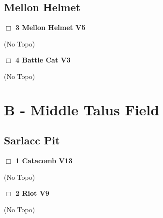 \begin{multicols}{2}
\needspace{10em}
\subsection*{Mellon Helmet}\label{bf:Mellon Helmet}




\needspace{2em}
\label{rt:Mellon Helmet}
\colorbox{RoyalBlue!20}{
\parbox{0.95\linewidth}{
\hspace{-1ex}\textbf{$\Box$
3 Mellon Helmet V5  
}}}
\begin{adjustwidth}{1.3em}{}			


  (No Topo)
\end{adjustwidth}




\needspace{2em}
\label{rt:Battle Cat}
\colorbox{green!20}{
\parbox{0.95\linewidth}{
\hspace{-1ex}\textbf{$\Box$
4 Battle Cat V3  
}}}
\begin{adjustwidth}{1.3em}{}			


  (No Topo)
\end{adjustwidth}





\newpage

\section{B - Middle Talus Field}\label{sa:Middle Talus Field}





\needspace{10em}
\subsection*{Sarlacc Pit}\label{bf:Sarlacc Pit}




\needspace{2em}
\label{rt:Catacomb}
\colorbox{red!20}{
\parbox{0.95\linewidth}{
\hspace{-1ex}\textbf{$\Box$
1 Catacomb V13  
}}}
\begin{adjustwidth}{1.3em}{}			


  (No Topo)
\end{adjustwidth}




\needspace{2em}
\label{rt:Riot}
\colorbox{Goldenrod!50}{
\parbox{0.95\linewidth}{
\hspace{-1ex}\textbf{$\Box$
2 Riot V9  
}}}
\begin{adjustwidth}{1.3em}{}			


  (No Topo)
\end{adjustwidth}






\end{multicols}
\clearpage